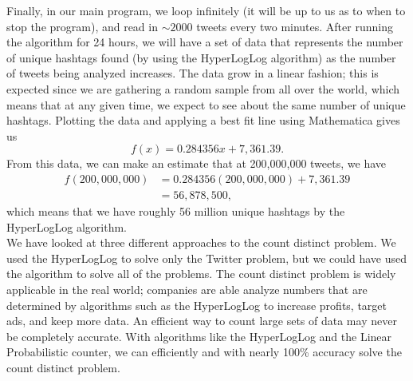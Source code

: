 \documentclass{article}
\begin{document}
Finally, in our main program, we loop infinitely (it will be up to us as to when to stop the program), and read in $\sim 2000$ tweets every two minutes. 
After running the algorithm for 24 hours, we will have a set of data that represents the number of unique hashtags found (by using the HyperLogLog algorithm) as the number of tweets being analyzed increases.
The data grow in a linear fashion; this is expected since we are gathering a random sample from all over the world, which means that at any given time, we expect to see about the same number of unique hashtags.
Plotting the data and applying a best fit line using Mathematica gives us
\[
f(x) = 0.284356 x + 7,361.39.
\]
From this data, we can make an estimate that at 200,000,000 tweets, we have
\begin{align*}
f(200,000,000) &= 0.284356(200,000,000) + 7,361.39\\
&= 56,878,500,
\end{align*}
which means that we have roughly 56 million unique hashtags by the HyperLogLog algorithm.\\ 

\indent We have looked at three different approaches to the count distinct problem. 
We used the HyperLogLog to solve only the Twitter problem, but we could have used the algorithm to solve all of the problems. 
The count distinct problem is widely applicable in the real world; companies are able analyze numbers that are determined by algorithms such as the HyperLogLog to increase profits, target ads, and keep more data.
An efficient way to count large sets of data may never be completely accurate. With algorithms like the HyperLogLog and the Linear Probabilistic counter, we can efficiently and with nearly 100\% accuracy solve the count distinct problem.
\end{document}
